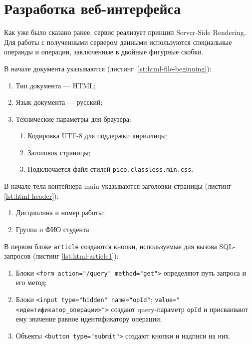 \section{Разработка веб-интерфейса}

Как уже было сказано ранее, сервис реализует принцип Server-Side Rendering.
Для работы с полученными сервером данными используются специальные операнды и операции, заключенные
в двойные фигурные скобки.

В начале документа указываются (листинг \ref{lst:html-file-beginning}):

\begin{enumerate}
    \item Тип документа --- HTML;
    \item Язык документа --- русский;
    \item Технические параметры для браузера:
    \begin{enumerate}
        \item Кодировка UTF-8 для поддержки кириллицы;
        \item Заголовок страницы;
        \item Подключается файл стилей \texttt{pico.classless.min.css}.
    \end{enumerate}
\end{enumerate}


\begin{listing}[h]
    \caption{Начало HTML-документа}
    \label{lst:html-file-beginning}
\end{listing}


В начале тела контейнера main указываются заголовки страницы (листинг \ref{lst:html-header}):

\begin{enumerate}
    \item Дисциплина и номер работы;
    \item Группа и ФИО студента.
\end{enumerate}


\begin{listing}[h]
    \caption{Заголовки страницы}
    \label{lst:html-header}
\end{listing}


В первом блоке \texttt{article} создаются кнопки, используемые для вызова SQL-запросов (листинг \ref{lst:html-article1}):

\begin{enumerate}
    \item Блоки \texttt{<form action="/query" method="get">} определяют путь запроса и его метод;
    \item Блоки \texttt{<input type="hidden" name="opId"};
    \texttt{value="<идентификатор\_операции>">} создают query-параметр \texttt{opId} и присваивают ему значение равное идентификатору операции;
    \item Объекты \texttt{<button type="submit">} создают кнопки и надписи на них.
\end{enumerate}


